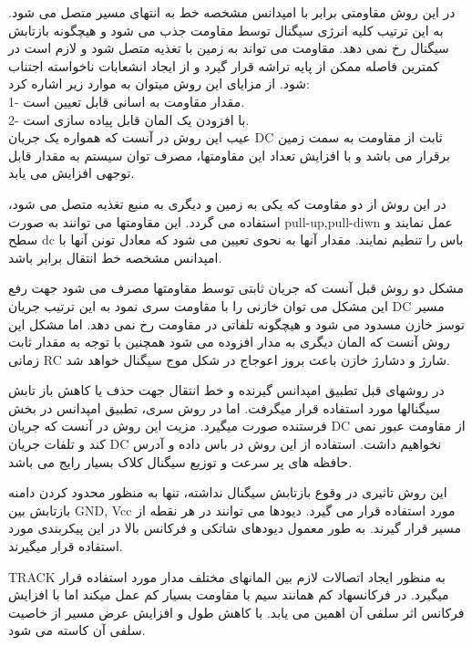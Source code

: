 در این روش مقاومتی برابر با امپدانس مشخصه خط به انتهای مسیر متصل می شود. به این ترتیب کلیه انرژی سیگنال توسط مقاومت جذب می شود و هیچگونه بازتابش سیگنال رخ نمی دهد. مقاومت می تواند به زمین با تغذیه متصل شود و لازم است در کمترین فاصله ممکن از پایه تراشه قرار گیرد و از ایجاد انشعابات ناخواسته اجتناب شود. از مزایای این روش میتوان به موارد زیر اشاره کرد:\\
1- مقدار مقاومت به اسانی قابل تعیین است.\\
2- با افزودن یک المان قابل پیاده سازی است.\\
عیب این روش در آنست که همواره یک جریان DC ثابت از مقاومت به سمت زمین برقرار می باشد و با افزایش تعداد این مقاومتها، مصرف توان سیستم به مقدار قابل توجهی افزایش می یابد. 

در این روش از دو مقاومت که یکی به زمین و دیگری به منبع تغذیه متصل می شود، استفاده می گردد.
این مقاومتها می توانند به صورت pull-up,pull-diwn عمل نمایند و سطح dc باس را تنطیم نمایند. مقدار آنها به نحوی تعیین می شود که معادل تونن آنها با امپدانس مشخصه خط انتقال برابر باشد.

مشکل دو روش قبل آنست که جریان ثابتی توسط مقاومتها مصرف می شود جهت رفع این مشکل می توان خازنی را با مقاومت سری نمود به این ترتیب جریان ِDC مسیر توسز خازن مسدود می شود و هیچگونه تلفاتی در مقاومت رخ نمی دهد. اما مشکل این روش آنست که المان دیگری به مدار افزوده می شود همچنین با توجه به مقدار ثابت زمانی RC شارژ و دشارژ خازن باعث بروز اعوجاج در شکل موج سیگنال خواهد شد.

در روشهای قبل تطبیق امپدانس گیرنده و خط انتقال جهت حذف یا کاهش باز تابش سیگنالها مورد استفاده قرار میگرفت. اما در روش سری، تطبیق امپدانس در بخش فرستنده صورت میگیرد.
مزیت این روش در آنست که جریان DC از مقاومت عبور نمی کند و تلفات جریان DC نخواهیم داشت.
استفاده از این روش در باس داده و آدرس حافظه های پر سرعت و توزیع سیگنال کلاک بسیار رایج می باشد.

این روش تاثیری در وقوع بازتابش سیگنال نداشته، تنها به منظور محدود کردن دامنه بازتابش بین GND, Vcc مورد استفاده قرار می گیرد. دیودها می توانند در هر نقطه از مسیر قرار گیرند. به طور معمول دیودهای شاتکی و فرکانس بالا در این پیکربندی مورد استفاده قرار میگیرند.


TRACK 
به منظور ایجاد اتصالات لازم بین المانهای مختلف مدار مورد استفاده قرار میگیرد. در فرکانسهاد کم همانند سیم با مقاومت بسیار کم عمل میکند اما با افزایش فرکانس اثر سلفی آن اهمین می یابد. با کاهش طول و افزایش عرض مسیر از خاصیت سلفی آن کاسته می شود.

